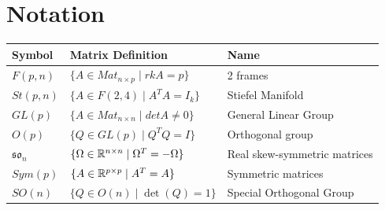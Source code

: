 \documentclass[11pt,a4paper]{report}
\begin{document}
\chapter{Notation}  
\noindent\begin{tabularx}{\textwidth}{@{}XXX@{}}  \toprule
  Symbol & Matrix Definition & Name \\
  \toprule
  $F(p,n)$  & $\{A \in Mat_{n \times p}  \; | \; rkA = p  \} $ & 2 frames \\
  \toprule
  $St(p,n)$ & $ \{ A \in F(2,4) \; | \; A^T A = I_k \} $ & Stiefel Manifold \\
  \toprule
  $ GL(p)$ &  $ \{ A \in Mat_{n \times n} \; | \; det A \neq 0 \}$ & General Linear Group \\
  \toprule
  $ O(p)$ & $ \{ Q \in GL(p) \; | \; Q^T Q = I \}$  & Orthogonal group \\
  \toprule
  $ \mathfrak{so}_n $ & $ \{ \Omega \in \mathbb{R}^{n \times n} \; | \; \Omega^T = - \Omega \} $ & Real skew-symmetric matrices \\
  \toprule
  $ Sym(p) $ & $ \{ A \in \mathbb{R}^{p \times p} \; | \; A^T = A \} $ & Symmetric matrices \\
  \toprule
  $ SO(n) $ & $ \{ Q \in O(n) \; | \; \det(Q) = 1 \} $ & Special Orthogonal Group \\
\end{tabularx}\offinterlineskip
\end{document}
